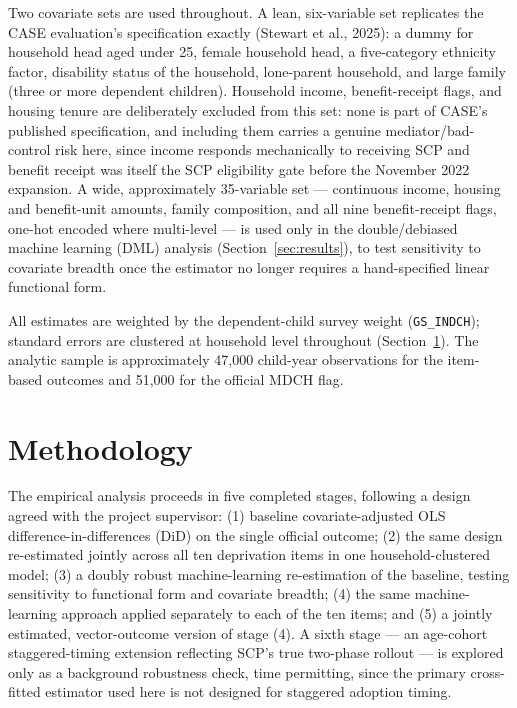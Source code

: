 


Two covariate sets are used throughout. A lean, six-variable set replicates the CASE evaluation's specification exactly (Stewart et al., 2025): a dummy for household head aged under 25, female household head, a five-category ethnicity factor, disability status of the household, lone-parent household, and large family (three or more dependent children). Household income, benefit-receipt flags, and housing tenure are deliberately excluded from this set: none is part of CASE's published specification, and including them carries a genuine mediator/bad-control risk here, since income responds mechanically to receiving SCP and benefit receipt was itself the SCP eligibility gate before the November 2022 expansion. A wide, approximately 35-variable set --- continuous income, housing and benefit-unit amounts, family composition, and all nine benefit-receipt flags, one-hot encoded where multi-level --- is used only in the double/debiased machine learning (DML) analysis (Section~\ref{sec:results}), to test sensitivity to covariate breadth once the estimator no longer requires a hand-specified linear functional form.

All estimates are weighted by the dependent-child survey weight (\texttt{GS\_INDCH}); standard errors are clustered at household level throughout (Section~\ref{sec:methodology}). The analytic sample is approximately 47,000 child-year observations for the item-based outcomes and 51,000 for the official MDCH flag.

\section{Methodology}
\label{sec:methodology}

The empirical analysis proceeds in five completed stages, following a design agreed with the project supervisor: (1) baseline covariate-adjusted OLS difference-in-differences (DiD) on the single official outcome; (2) the same design re-estimated jointly across all ten deprivation items in one household-clustered model; (3) a doubly robust machine-learning re-estimation of the baseline, testing sensitivity to functional form and covariate breadth; (4) the same machine-learning approach applied separately to each of the ten items; and (5) a jointly estimated, vector-outcome version of stage (4). A sixth stage --- an age-cohort staggered-timing extension reflecting SCP's true two-phase rollout --- is explored only as a background robustness check, time permitting, since the primary cross-fitted estimator used here is not designed for staggered adoption timing.

